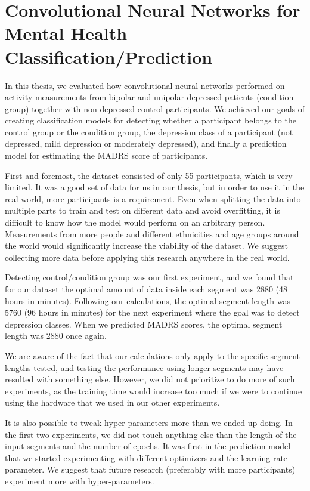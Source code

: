 \section{Convolutional Neural Networks for Mental Health Classification/Prediction}

In this thesis, we evaluated how convolutional neural networks performed on activity measurements from bipolar and unipolar depressed patients (condition group) together with non-depressed control participants. We achieved our goals of creating classification models for detecting whether a participant belongs to the control group or the condition group, the depression class of a participant (not depressed, mild depression or moderately depressed), and finally a prediction model for estimating the MADRS score of participants. 

First and foremost, the dataset consisted of only 55 participants, which is very limited. It was a good set of data for us in our thesis, but in order to use it in the real world, more participants is a requirement. Even when splitting the data into multiple parts to train and test on different data and avoid overfitting, it is difficult to know how the model would perform on an arbitrary person. Measurements from more people and different ethnicities and age groups around the world would significantly increase the viability of the dataset. We suggest collecting more data before applying this research anywhere in the real world.

Detecting control/condition group was our first experiment, and we found that for our dataset the optimal amount of data inside each segment was 2880 (48 hours in minutes). Following our calculations, the optimal segment length was 5760 (96 hours in minutes) for the next experiment where the goal was to detect depression classes. When we predicted MADRS scores, the optimal segment length was 2880 once again. 

We are aware of the fact that our calculations only apply to the specific segment lengths tested, and testing the performance using longer segments may have resulted with something else. However, we did not prioritize to do more of such experiments, as the training time would increase too much if we were to continue using the hardware that we used in our other experiments. 

It is also possible to tweak hyper-parameters more than we ended up doing. In the first two experiments, we did not touch anything else than the length of the input segments and the number of epochs. It was first in the prediction model that we started experimenting with different optimizers and the learning rate parameter. We suggest that future research (preferably with more participants) experiment more with hyper-parameters.  

